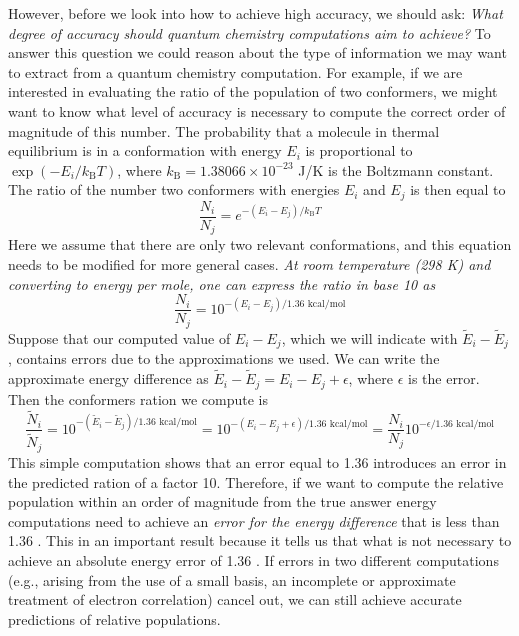 \documentclass[../Main/notes.tex]{subfiles}
\begin{document}
However, before we look into how to achieve high accuracy, we should ask: \emph{What degree of accuracy should quantum chemistry computations aim to achieve?}
To answer this question we could reason about the type of information we may want to extract from a quantum chemistry computation.
For example, if we are interested in evaluating the ratio of the population of two conformers, we might want to know what level of accuracy is necessary to compute the correct order of magnitude of this number.
The probability that a molecule in thermal equilibrium is in a conformation with energy $E_i$ is proportional to $\exp(-E_i  / k_\mathrm{B} T)$, where $k_\mathrm{B} = 1.38066 \times 10^{-23}$ J/K is the Boltzmann constant. 
The ratio of the number two conformers with energies $E_i$ and $E_j$ is then equal to
\begin{equation}
\frac{N_i}{N_j} = e^{- (E_i - E_j) / k_\mathrm{B} T}
\end{equation}
Here we assume that there are only two relevant conformations, and this equation needs to be modified for more general cases.
\emph{At room temperature (298 K) and converting to energy per mole, one can express the ratio in base 10 as}
\begin{equation}
\frac{N_i}{N_j} = 10^{- (E_i - E_j) / 1.36 \text{ kcal/mol}}
\end{equation}
Suppose that our computed value of $E_i - E_j$, which we will indicate with $\tilde{E}_i - \tilde{E}_j$, contains errors due to the approximations we used.
We can write the approximate energy difference as $\tilde{E}_i - \tilde{E}_j = E_i - E_j + \epsilon$, where $\epsilon$ is the error.
Then the conformers ration we compute is
\begin{equation}
\frac{\tilde{N}_i}{\tilde{N}_j} = 10^{- (\tilde{E}_i - \tilde{E}_j) / 1.36 \text{ kcal/mol}} = 10^{- (E_i - E_j + \epsilon) / 1.36 \text{ kcal/mol}}
= \frac{N_i}{N_j} 10^{-  \epsilon / 1.36 \text{ kcal/mol}}
\end{equation}
This simple computation shows that an error equal to 1.36 \kcal introduces an error in the predicted ration of a factor 10.
Therefore, if we want to compute the relative population within an order of magnitude from the true answer energy computations need to achieve an \emph{error for the energy difference} that is less than 1.36 \kcal.
This in an important result because it tells us that what is not necessary to achieve an absolute energy error of 1.36 \kcal.
If errors in two different computations (e.g., arising from the use of a small basis, an incomplete or approximate treatment of electron correlation) cancel out, we can still achieve accurate predictions of relative populations.
\end{document}
